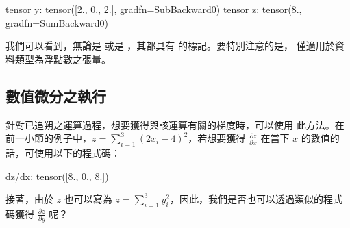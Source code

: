 \documentclass[letterpaper,10pt,english]{sphinxmanual}
\begin{document}
\begin{sphinxVerbatim}[commandchars=\\\{\}]
tensor y: 
 tensor([\PYGZhy{}2.,  0.,  2.], grad\PYGZus{}fn=\PYGZlt{}SubBackward0\PYGZgt{})
tensor z: 
 tensor(8., grad\PYGZus{}fn=\PYGZlt{}SumBackward0\PYGZgt{})
\end{sphinxVerbatim}

我們可以看到，無論是  或是 ，其都具有  的標記。要特別注意的是， 僅適用於資料類型為浮點數之張量。


\subsection{數值微分之執行}
\label{\detokenize{notebook/lab-torch-diff-opt:id3}}
針對已追朔之運算過程，想要獲得與該運算有關的梯度時，可以使用 此方法。在前一小節的例子中，\(z = \sum_{i=1}^3 (2x_{i} - 4)^2\)，若想要獲得 \(\frac{\partial z}{\partial x}\) 在當下 \(x\) 的數值的話，可使用以下的程式碼：

\begin{sphinxVerbatim}[commandchars=\\\{\}]
 
\end{sphinxVerbatim}

\begin{sphinxVerbatim}[commandchars=\\\{\}]
dz/dx:  tensor([\PYGZhy{}8.,  0.,  8.])
\end{sphinxVerbatim}

接著，由於 \(z\) 也可以寫為 \(z = \sum_{i=1}^3 y_{i}^2\)，因此，我們是否也可以透過類似的程式碼獲得 \(\frac{\partial z}{\partial y}\) 呢？

\begin{sphinxVerbatim}[commandchars=\\\{\}]
 
\end{sphinxVerbatim}
\end{document}

